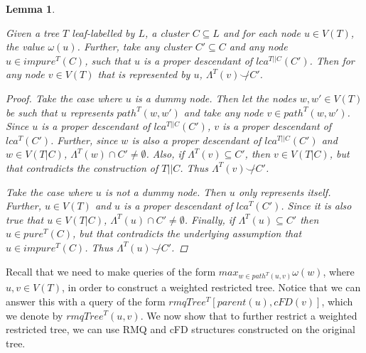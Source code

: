 \documentclass[12pt,a4paper]{article}
\newcommand{\compatible}{\smile}
\newcommand{\leafset}{\Lambda}
\newcommand{\weight}{\omega}
\newtheorem{impurenodesincompatible}[incompatibility]{Lemma}
\begin{document}
    \begin{impurenodesincompatible}
        \label{lem:impurenodesincompatible}

        Given a tree $T$ leaf-labelled by $L$, a cluster $C \subseteq L$ and for each node $u \in V(T)$, the value $\weight(u)$. Further, take any cluster $C' \subseteq C$ and any node $u \in impure^{T}(C)$, such that $u$ is a proper descendant of $lca^{T||C}(C')$. Then for any node $v \in V(T)$ that is represented by $u$, $\leafset^{T}(v) \not\compatible C'$.

        \begin{proof}
            Take the case where $u$ is a dummy node. Then let the nodes $w, w' \in V(T)$ be such that $u$ represents $path^{T}(w, w')$ and take any node $v \in path^{T}(w, w')$. Since $u$ is a proper descendant of $lca^{T||C}(C')$, $v$ is a proper descendant of $lca^{T}(C')$. Further, since $w$ is also a proper descendant of $lca^{T||C}(C')$ and $w \in V(T|C)$, $\leafset^{T}(w) \cap C' \neq \emptyset$. Also, if $\leafset^{T}(v) \subseteq C'$, then $v \in V(T|C)$, but that contradicts the construction of $T||C$. Thus $\leafset^{T}(v) \not\compatible C'$.

            Take the case where $u$ is not a dummy node. Then $u$ only represents itself. Further, $u \in V(T)$ and $u$ is a proper descendant of $lca^{T}(C')$. Since it is also true that $u \in V(T|C)$, $\leafset^{T}(u) \cap C' \neq \emptyset$. Finally, if $\leafset^{T}(u) \subseteq C'$ then $u \in pure^{T}(C)$, but that contradicts the underlying assumption that $u \in impure^{T}(C)$. Thus $\leafset^{T}(u) \not\compatible C'$.
        \end{proof}
    \end{impurenodesincompatible}

    Recall that we need to make queries of the form $max_{w \in path^{T}(u, v)} \weight(w)$, where $u, v \in V(T)$, in order to construct a weighted restricted tree. Notice that we can answer this with a query of the form $rmqTree^{T}[parent(u), cFD(v)]$, which we denote by $rmqTree^{T}(u, v)$. We now show that to further restrict a weighted restricted tree, we can use RMQ and cFD structures constructed on the original tree.
    \newline
\end{document}
